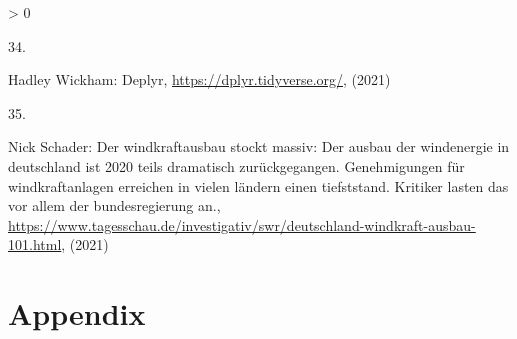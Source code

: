 \documentclass[a4paper,11pt]{article}
\newlength{\cslhangindent}
\newlength{\csllabelwidth}
\newenvironment{CSLReferences}[3] %
 {%
  \setlength{\parindent}{0pt}
  \ifodd #1 \everypar{\setlength{\hangindent}{\cslhangindent}}\ignorespaces\fi
  \ifnum #2 > 0
  \setlength{\parskip}{#2\baselineskip}
  \fi
 }%
 {}
\newcommand{\CSLLeftMargin}[1]{\parbox[t]{\maxof{\widthof{#1}}{\csllabelwidth}}{#1}}
\newcommand{\CSLRightInline}[1]{\parbox[t]{\linewidth}{#1}}
\begin{document}
\begin{CSLReferences}{0}{0}
\leavevmode\hypertarget{ref-HadleyWickham.2021}{}%
\CSLLeftMargin{34. }
\CSLRightInline{Hadley Wickham: Deplyr, \url{https://dplyr.tidyverse.org/}, (2021)}

\leavevmode\hypertarget{ref-NickSchader.2021}{}%
\CSLLeftMargin{35. }
\CSLRightInline{Nick Schader: Der windkraftausbau stockt massiv: Der ausbau der windenergie in deutschland ist 2020 teils dramatisch zur{ü}ckgegangen. Genehmigungen f{ü}r windkraftanlagen erreichen in vielen l{ä}ndern einen tiefststand. Kritiker lasten das vor allem der bundesregierung an., \url{https://www.tagesschau.de/investigativ/swr/deutschland-windkraft-ausbau-101.html}, (2021)}

\end{CSLReferences}
\indent
\setlength{\parindent}{17pt}
\setlength{\leftskip}{0pt}
\setlength{\parskip}{0pt}

\newpage

\appendix

\hypertarget{appendix}{%
\section{Appendix}\label{appendix}}
\end{document}
